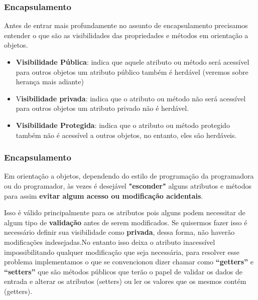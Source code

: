 \begin{frame}
	\frametitle{Encapsulamento}
	\par Antes de entrar mais profundamente no assunto de encapsulamento precisamos entender o que são as visibilidades das propriedades e métodos em orientação a objetos.
	
	\begin{itemize}
		\item \textbf{Visibilidade Pública}: indica que aquele atributo ou método será acessível para outros objetos um atributo público também é herdável (veremos sobre herança mais adiante)
		\item V\textbf{isibilidade privada}: indica que o atributo ou método não será acessível para outros objetos um atributo privado não é herdável.
		\item \textbf{Visibilidade Protegida}: indica que o atributo ou método protegido também não é acessível a outros objetos, no entanto, eles são herdáveis. 
	\end{itemize}
\end{frame}

\begin{frame}
	\frametitle{Encapsulamento}
	
	\par Em orientação a objetos, dependendo do estilo de programação da programadora ou do programador, às vezes é desejável \textbf{"esconder"} alguns atributos e métodos para assim \textbf{evitar algum acesso ou modificação acidentais}. \newline
	
	\par Isso é válido principalmente para os atributos pois alguns podem necessitar de algum tipo de \textbf{validação} antes de serem modificados. Se quisermos fazer isso  é necessário definir sua visibilidade como \textbf{privada}, dessa forma, não haverão modificações indesejadas.No entanto isso deixa o atributo inacessível impossibilitando qualquer modificação que seja necessária, para resolver esse problema implementamos o que se convencionou dizer chamar como \textbf{“getters”} e \textbf{“setters”} que são métodos públicos que terão o papel de validar os dados de entrada e alterar os atributos (setters) ou ler os valores que os mesmos contém (getters). 
\end{frame}

